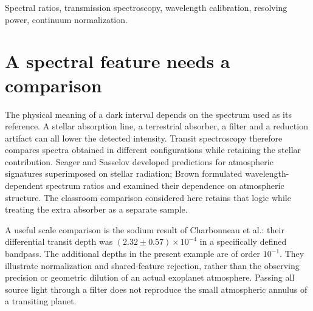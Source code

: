 \begin{abstract}
Paired spectra can distinguish a shared absorption feature from additional attenuation only when wavelength registration and intensity normalization are preserved. The data contain twenty-one wavelength bins from 400 to 700~nm, with sample, star-only, continuum-reference and dark intensities. At 595~nm the sample is 55.2\% below the entered continuum reference, but the star-only spectrum already contains a substantial depression. Dividing the two dark-subtracted spectra leaves an additional depth of 0.132, only 0.0225 above the neighbouring-bin baseline. The 15-nm sampling interval describes broad spectral sampling; narrow-line identification also depends on the instrumental line-spread function. The analysis relates these distinctions to transmission spectroscopy and shows why wavelength calibration uncertainty alone cannot establish spectral resolution or detection significance.
\end{abstract}
\begin{IEEEkeywords}
Spectral ratios, transmission spectroscopy, wavelength calibration, resolving power, continuum normalization.
\end{IEEEkeywords}

\section{A spectral feature needs a comparison}
The physical meaning of a dark interval depends on the spectrum used as its reference. A stellar absorption line, a terrestrial absorber, a filter and a reduction artifact can all lower the detected intensity. Transit spectroscopy therefore compares spectra obtained in different configurations while retaining the stellar contribution. Seager and Sasselov developed predictions for atmospheric signatures superimposed on stellar radiation\cite{seager2000}; Brown formulated wavelength-dependent spectrum ratios and examined their dependence on atmospheric structure\cite{brown2001}. The classroom comparison considered here retains that logic while treating the extra absorber as a separate sample.

A useful scale comparison is the sodium result of Charbonneau et al.\cite{charbonneau2002}: their differential transit depth was $(2.32\pm0.57)\times10^{-4}$ in a specifically defined bandpass. The additional depths in the present example are of order $10^{-1}$. They illustrate normalization and shared-feature rejection, rather than the observing precision or geometric dilution of an actual exoplanet atmosphere. Passing all source light through a filter does not reproduce the small atmospheric annulus of a transiting planet.

